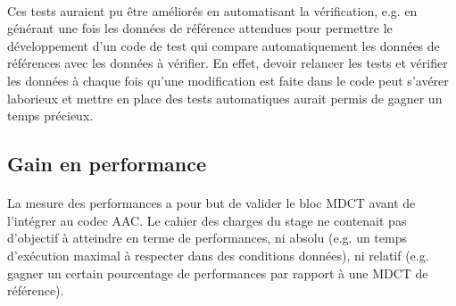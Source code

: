 \documentclass{article}
\begin{document}
    \paragraph{}
    Ces tests auraient pu être améliorés en automatisant la vérification, e.g. en générant une fois les données de référence attendues pour permettre le développement d'un code de test qui compare automatiquement les données de références avec les données à vérifier. En effet, devoir relancer les tests et vérifier les données à chaque fois qu'une modification est faite dans le code peut s'avérer laborieux et mettre en place des tests automatiques aurait permis de gagner un temps précieux.











    \subsection{Gain en performance}
    \label{sec:mdct_perfs}
    \paragraph{}
    La mesure des performances a pour but de valider le bloc MDCT avant de l'intégrer au codec AAC. Le cahier des charges du stage ne contenait pas d'objectif à atteindre en terme de performances, ni absolu (e.g. un temps d'exécution maximal à respecter dans des conditions données), ni relatif (e.g. gagner un certain pourcentage de performances par rapport à une MDCT de référence).
\end{document}
